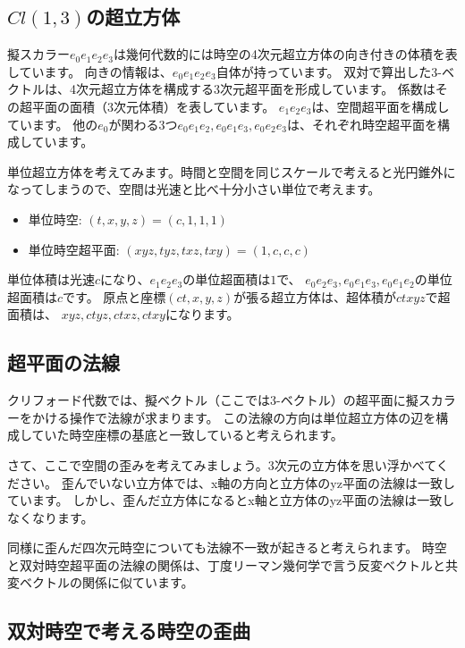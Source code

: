 \documentclass[a4paper,12pt,notitlepage]{jsreport}
\begin{document}
\subsection{$ Cl(1,3) $の超立方体}

擬スカラー$ e_0 e_1 e_2 e_3 $は幾何代数的には時空の4次元超立方体の向き付きの体積を表しています。
向きの情報は、$ e_0 e_1 e_2 e_3 $自体が持っています。
双対で算出した3-ベクトルは、4次元超立方体を構成する3次元超平面を形成しています。
係数はその超平面の面積（3次元体積）を表しています。
$ e_1 e_2 e_3 $は、空間超平面を構成しています。
他の$ e_0 $が関わる3つ$ e_0 e_1 e_2, e_0 e_1 e_3, e_0 e_2 e_3 $は、それぞれ時空超平面を構成しています。

単位超立方体を考えてみます。時間と空間を同じスケールで考えると光円錐外になってしまうので、空間は光速と比べ十分小さい単位で考えます。
\begin{itemize}
  \item 単位時空: $ (t, x, y, z) = (c, 1, 1, 1) $
  \item 単位時空超平面: $ (xyz, tyz, txz, txy) = (1, c, c, c) $
\end{itemize}
単位体積は光速$ c $になり、$ e_1 e_2 e_3 $の単位超面積は$ 1 $で、
$ e_0 e_2 e_3, e_0 e_1 e_3, e_0 e_1 e_2 $の単位超面積は$ c $です。
原点と座標$ (c t, x, y, z) $が張る超立方体は、超体積が$ c t x y z $で超面積は、
$ x y z, c t y z, c t x z, c t x y $になります。

\subsection{超平面の法線}

クリフォード代数では、擬ベクトル（ここでは3-ベクトル）の超平面に擬スカラーをかける操作で法線が求まります。
この法線の方向は単位超立方体の辺を構成していた時空座標の基底と一致していると考えられます。

さて、ここで空間の歪みを考えてみましょう。3次元の立方体を思い浮かべてください。
歪んでいない立方体では、x軸の方向と立方体のyz平面の法線は一致しています。
しかし、歪んだ立方体になるとx軸と立方体のyz平面の法線は一致しなくなります。

同様に歪んだ四次元時空についても法線不一致が起きると考えられます。
時空と双対時空超平面の法線の関係は、丁度リーマン幾何学で言う反変ベクトルと共変ベクトルの関係に似ています。

\subsection{双対時空で考える時空の歪曲}
\end{document}
